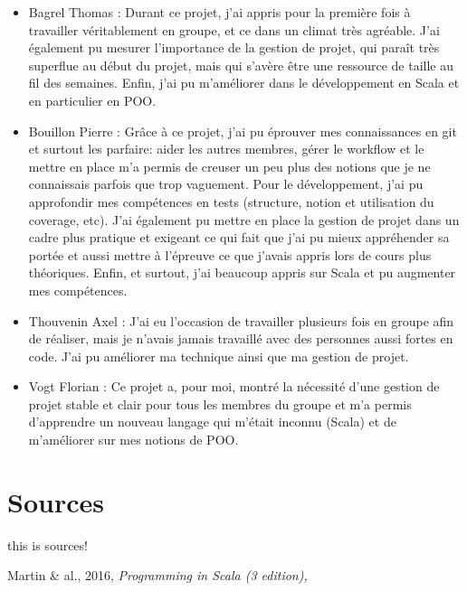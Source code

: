\documentclass[a4paper, 12pt]{report}
\begin{document}
\begin{itemize}

\item
  Bagrel Thomas :
  Durant ce projet, j’ai appris pour la première fois à travailler véritablement en groupe, et ce dans un climat très agréable. J’ai également pu mesurer l’importance de la gestion de projet, qui paraît très superflue au début du projet, mais qui s’avère être une ressource de taille au fil des semaines. Enfin, j’ai pu m’améliorer dans le développement en Scala et en particulier en POO.
  
\item
  Bouillon Pierre :
  Grâce à ce projet, j'ai pu éprouver mes connaissances en git et surtout les parfaire: aider les autres membres, gérer le workflow et le mettre en place m'a permis de creuser un peu plus des notions que je ne connaissais parfois que trop vaguement.
  Pour le développement, j'ai pu approfondir mes compétences en tests (structure, notion et utilisation du coverage, etc).
  J'ai également pu mettre en place la gestion de projet dans un cadre plus pratique et exigeant ce qui fait que j'ai pu mieux appréhender sa portée et aussi mettre à l'épreuve ce que j'avais appris lors de cours plus théoriques.
  Enfin, et surtout, j'ai beaucoup appris sur Scala et pu augmenter mes compétences.
 
 
\item
  Thouvenin Axel :
  J’ai eu l’occasion de travailler plusieurs fois en groupe afin de réaliser, mais je n’avais jamais travaillé avec des personnes aussi fortes en code. J’ai pu améliorer ma technique ainsi que ma gestion de projet.

\item
  Vogt Florian :
  Ce projet a, pour moi, montré la nécessité d’une gestion de projet stable et clair pour tous les membres du groupe et m’a permis d’apprendre un nouveau langage qui m’était inconnu (Scala) et de m’améliorer sur mes notions de POO.


\end{itemize}


    
\part*{Sources}\label{part:sources}

this is sources!

Martin  \& al., 2016, \it{Programming in Scala} (3 edition), 

\end{document}
